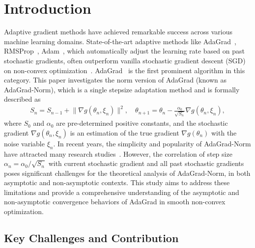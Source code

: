 \documentclass[standalone]{article}
\begin{document}
\section{Introduction}
 
Adaptive gradient methods have achieved remarkable success across various machine learning domains. State-of-the-art adaptive methods like AdaGrad~\citep{duchi2011adaptive}, RMSProp~\citep{RMSProp}, Adam~\citep{Adam},  which automatically adjust the learning rate based on past stochastic gradients, often outperform 
vanilla stochastic gradient descent (SGD) on non-convex optimization~\citep{vaswani2017attention,2013Estimation,2018Canonical,DBLP:conf/iclr/DosovitskiyB0WZ21}. AdaGrad~\citep{duchi2011adaptive,mcmahan2010adaptive} is the first prominent algorithm in this category. This paper investigates the norm version of AdaGrad (known as AdaGrad-Norm), which is a single stepsize adaptation method and is formally described as
\begin{equation}\label{AdaGrad_Norm}\begin{aligned}
S_{n}=S_{n-1}+\big\|\nabla g(\theta_{n},\xi_{n})\big\|^{2},
	\quad \theta_{n+1}=\theta_{n}-\frac{\alpha_0}{\sqrt{S_{n}}}\nabla g(\theta_{n},\xi_{n}),
\end{aligned}\end{equation} 
where $S_{0}$ and  $\alpha_{0}$ are pre-determined positive constants, and the stochastic gradient $\nabla g(\theta_{n},\xi_{n})$ is an estimation of the true gradient $\nabla g(\theta_n)$ with the noise variable $\xi_n$. In recent years, the simplicity and popularity of AdaGrad-Norm have attracted many research studies~\citep{zou2018weighted,ward2020adagrad,defossez2020simple,kavis2022high,faw2022power,wang2023convergence,jin2022convergence}. However, the correlation of step size $\alpha_n = \alpha_0/\sqrt{S_n}$ with current stochastic gradient and all past stochastic gradients poses significant challenges for the theoretical analysis of AdaGrad-Norm,  in both asymptotic
and non-asymptotic contexts. This study aims to address these limitations and provide a comprehensive understanding of the asymptotic and non-asymptotic convergence behaviors of AdaGrad in smooth non-convex optimization.


\subsection{Key Challenges and Contribution}\label{subsection 1.1}
\end{document}
